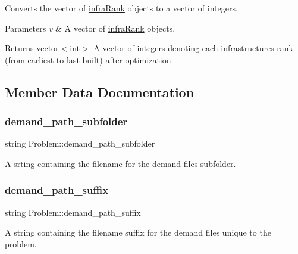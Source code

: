 Converts the vector of \mbox{\hyperlink{structinfraRank}{infra\+Rank}} objects to a vector of integers. 


\begin{DoxyParams}{Parameters}
{\em v} & A vector of \mbox{\hyperlink{structinfraRank}{infra\+Rank}} objects. \\
\hline
\end{DoxyParams}
\begin{DoxyReturn}{Returns}
vector$<$int$>$ A vector of integers denoting each infrastructure\textquotesingle{}s rank (from earliest to last built) after optimization. 
\end{DoxyReturn}


\subsection{Member Data Documentation}
\mbox{\label{classProblem_a42888c08816db8b32b355decf102d67a}} 
\subsubsection{\texorpdfstring{demand\+\_\+path\+\_\+subfolder}{demand\_path\_subfolder}}
{\footnotesize\ttfamily string Problem\+::demand\+\_\+path\+\_\+subfolder\hspace{0.3cm}{\ttfamily [protected]}}



A srting containing the filename for the demand files subfolder. 

\mbox{\label{classProblem_af9e30ddbb2f59e28f0970cf46932cd6d}} 
\subsubsection{\texorpdfstring{demand\+\_\+path\+\_\+suffix}{demand\_path\_suffix}}
{\footnotesize\ttfamily string Problem\+::demand\+\_\+path\+\_\+suffix\hspace{0.3cm}{\ttfamily [protected]}}



A string containing the filename suffix for the demand files unique to the problem. 

